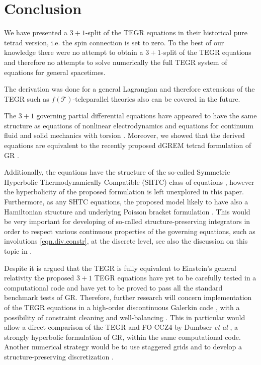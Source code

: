 \documentclass[
10pt, %
a4paper, %
oneside, %
headinclude,footinclude, %
BCOR5mm, %
]{scrartcl}
\newcommand{\Tscal}{\mathcal{T}}		%
\begin{document}
\section{Conclusion}

We have presented a $ 3+1 $-split of the TEGR equations in their historical pure tetrad version, 
i.e. the spin connection is set to zero. To the best of our knowledge there were no attempt to 
obtain a $ 3+1 $-split of the TEGR equations and therefore no attempts to solve numerically the 
full TEGR system of equations for general spacetimes. 

The derivation was done for a general Lagrangian and therefore extensions of the TEGR such as $ 
f(\Tscal) $-teleparallel theories also can be covered in the future. 

The $ 3+1 $ governing partial differential equations have appeared to have the same structure as 
equations of nonlinear electrodynamics \cite{DPRZ2017} and equations for continuum fluid and solid 
mechanics with torsion \cite{Torsion2019}. Moreover, we showed that the derived equations are 
equivalent to the recently proposed dGREM tetrad formulation of GR \cite{Olivares2022}. 

Additionally, the equations have the structure of the so-called Symmetric Hyperbolic 
Thermodynamically 
Compatible (SHTC) class of equations \cite{God1961,SHTC-GENERIC-CMAT}, however the hyperbolicity of 
the proposed formulation is left unexplored in this paper. Furthermore, as any SHTC equations, the 
proposed model likely to have also a Hamiltonian structure and underlying Poisson bracket 
formulation \cite{SHTC-GENERIC-CMAT,PKG_Book2018}. This would be very important for developing of 
so-called structure-preserving integrators \cite{HTC2022} in order to respect various continuous 
properties of the 
governing equations, such as involutions \eqref{eqn.div.constr}, at the discrete level, see also the 
discussion on this topic in \cite{Olivares2022}.

Despite it is argued that the TEGR is fully equivalent to Einstein's general relativity the 
proposed $ 3+1 $ TEGR equations have yet to be carefully tested in a computational code and have 
yet to be proved to pass all the standard benchmark tests of GR. Therefore, further research will 
concern implementation of the TEGR equations in a high-order discontinuous Galerkin code 
\cite{Dumbser2018a,Busto2020}, with a possibility of constraint cleaning  \cite{Dumbser2019} and 
well-balancing 
\cite{Gaburro2021}. This in particular would allow a direct comparison of the TEGR and FO-CCZ4 by 
Dumbser \textit{et al} \cite{FO-CCZ4}, a
strongly hyperbolic formulation of GR, within the same computational code.  Another 
numerical 
strategy would be to use staggered grids and to develop a
structure-preserving discretization \cite{SIGPR2021,Olivares2022,Fambri2020a}. 
\end{document}

